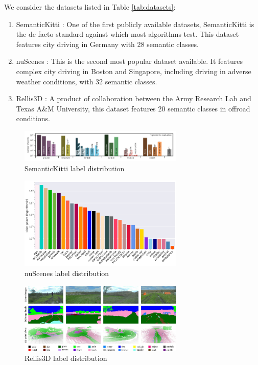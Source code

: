 We consider the datasets listed in Table \ref{tab:datasets}:
\begin{enumerate}
  \item SemanticKitti \cite{semantickitti1,semantickitti2}: One of the first publicly available datasets, SemanticKitti is the de facto standard against which most algorithms test. This dataset features city driving in Germany with 28 semantic classes.
  \item nuScenes \cite{nuscenes}: This is the second most popular dataset available. It features complex city driving in Boston and Singapore, including driving in adverse weather conditions, with 32 semantic classes.
  \item Rellis3D \cite{rellis3d}: A product of collaboration between the Army Research Lab and Texas A\&M University, this dataset features 20 semantic classes in offroad conditions.
\end{enumerate}

\begin{figure}[htp]
  \centering
  \includegraphics[width=0.7\textwidth]{images/semantic_kitti_label_distribution.png}
  \caption{SemanticKitti label distribution}
  \label{fig:semantickitti-label-distribution}
\end{figure}

\begin{figure}[htp]
  \centering
  \includegraphics[width=0.7\textwidth]{images/nuscenes_label_set.png}
  \caption{nuScenes label distribution}
  \label{fig:nuscenes-label-set}
\end{figure}

\begin{figure}[htp]
  \centering
  \includegraphics[width=0.7\textwidth]{images/rellis_label_suite.png}
  \caption{Rellis3D label distribution}
  \label{fig:rellis-labe-suite}
\end{figure}

